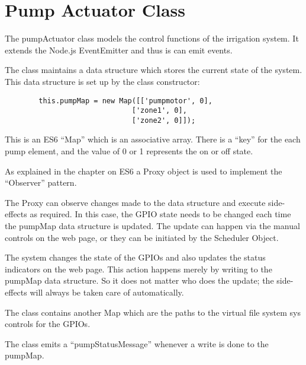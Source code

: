 \chapter{Pump Actuator Class}

The pumpActuator class models the control functions of the irrigation system.  
It extends the Node.js EventEmitter and thus is can emit events.

The class maintains a data structure which stores the current state of the 
system.  This data structure is set up by the class constructor:

\begin{verbatim}
        this.pumpMap = new Map([['pumpmotor', 0],
                              ['zone1', 0],
                              ['zone2', 0]]);
\end{verbatim}

This is an ES6 ``Map'' which is an associative array.  There is a ``key'' for 
the each pump element, and the value of 0 or 1 represents the on or off state.

As explained in the chapter on ES6 a Proxy object is used to implement the 
``Observer'' pattern.

The Proxy can observe changes made to the data structure and execute 
side-effects as required.  In this case, the GPIO state needs to be changed 
each time the pumpMap data structure is updated.  The update can happen via the 
manual controls on the web page, or they can be initiated by the Scheduler 
Object.

The system changes the state of the GPIOs and also updates the status 
indicators on the web page.  This action happens merely by writing to the 
pumpMap data structure.  So it does not matter who does the update; the 
side-effects will always be taken care of automatically.

The class contains another Map which are the paths to the virtual file system 
sys controls for the GPIOs.

The class emits a ``pumpStatusMessage'' whenever a write is done to the pumpMap.
